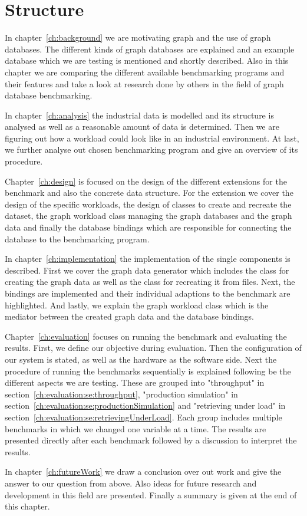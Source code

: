 \section{Structure}
In chapter~\ref{ch:background} we are motivating graph and the use of graph databases.
The different kinds of graph databases are explained and an example database which we are testing is mentioned and shortly described.
Also in this chapter we are comparing the different available benchmarking programs and their features and take a look at research done by others in the field of graph database benchmarking.

In chapter~\ref{ch:analysis} the industrial data is modelled and its structure is analysed as well as a reasonable amount of data is determined.
Then we are figuring out how a workload could look like in an industrial environment.
At last,
we further analyse out chosen benchmarking program and give an overview of its procedure.

Chapter~\ref{ch:design} is focused on the design of the different extensions for the benchmark and also the concrete data structure.
For the extension we cover the design of the specific workloads,
the design of classes to create and recreate the dataset,
the graph workload class managing the graph databases and the graph data and finally the database bindings which are responsible for connecting the database to the benchmarking program.

In chapter~\ref{ch:implementation} the implementation of the single components is described.
First we cover the graph data generator which includes the class for creating the graph data as well as the class for recreating it from files.
Next,
the bindings are implemented and their individual adaptions to the benchmark are highlighted.
And lastly,
we explain the graph workload class which is the mediator between the created graph data and the database bindings.

Chapter~\ref{ch:evaluation} focuses on running the benchmark and evaluating the results.
First, we define our objective during evaluation.
Then the configuration of our system is stated, as well as the hardware as the software side.
Next the procedure of running the benchmarks sequentially is explained following be the different aspects we are testing.
These are grouped into "throughput" in section~\ref{ch:evaluation:se:throughput}, "production simulation" in section~\ref{ch:evaluation:se:productionSimulation} and "retrieving under load" in section~\ref{ch:evaluation:se:retrievingUnderLoad}.
Each group includes multiple benchmarks in which we changed one variable at a time.
The results are presented directly after each benchmark followed by a discussion to interpret the results.

In chapter~\ref{ch:futureWork} we draw a conclusion over out work and give the answer to our question from above.
Also ideas for future research and development in this field are presented.
Finally a summary is given at the end of this chapter.
